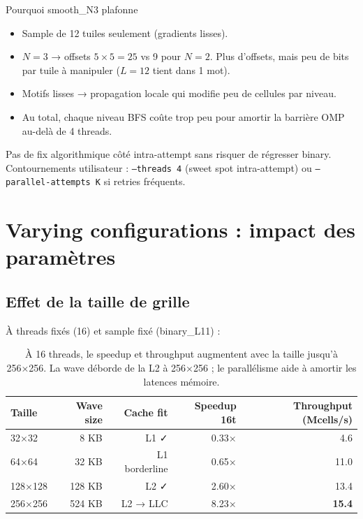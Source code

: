 \begin{important}{Pourquoi smooth\_N3 plafonne}
\begin{itemize}
    \item Sample de 12 tuiles seulement (gradients lisses).
    \item $N = 3$ → offsets $5 \times 5 = 25$ vs 9 pour $N = 2$. Plus d'offsets, mais peu de bits par tuile à manipuler ($L = 12$ tient dans 1 mot).
    \item Motifs lisses → propagation locale qui modifie peu de cellules par niveau.
    \item Au total, chaque niveau BFS coûte trop peu pour amortir la barrière OMP au-delà de 4 threads.
\end{itemize}

Pas de fix algorithmique côté intra-attempt sans risquer de régresser binary. Contournements utilisateur : \texttt{--threads 4} (sweet spot intra-attempt) ou \texttt{--parallel-attempts K} si retries fréquents.
\end{important}

\section{Varying configurations : impact des paramètres}
\label{sec:res:varying_configs}

\subsection{Effet de la taille de grille}

À threads fixés (16) et sample fixé (binary\_L11) :

\begin{table}[H]
\centering
\begin{tabular}{lrrrr}
\toprule
\textbf{Taille} & \textbf{Wave size} & \textbf{Cache fit} & \textbf{Speedup 16t} & \textbf{Throughput (Mcells/s)} \\
\midrule
32×32 & 8 KB & L1 ✓ & 0.33× & 4.6 \\
64×64 & 32 KB & L1 borderline & 0.65× & 11.0 \\
128×128 & 128 KB & L2 ✓ & 2.60× & 13.4 \\
256×256 & 524 KB & L2 → LLC & 8.23× & \textbf{15.4} \\
\bottomrule
\end{tabular}
\caption{À 16 threads, le speedup et throughput augmentent avec la taille jusqu'à 256×256. La wave déborde de la L2 à 256×256 ; le parallélisme aide à amortir les latences mémoire.}
\label{tab:res:varying_size}
\end{table}

